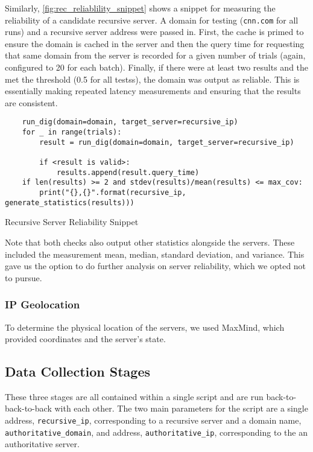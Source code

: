Similarly, \cref{fig:rec_reliablility_snippet} shows a snippet for measuring the reliability of a candidate recursive server. A domain for testing (\texttt{cnn.com} for all runs) and a recursive server \ip address were passed in. First, the cache is primed to ensure the domain is cached in the server and then the query time for requesting that same domain from the server is recorded for a given number of trials (again, configured to 20 for each batch). Finally, if there were at least two results and the \cv met the threshold (0.5 for all testss), the domain was output as reliable. This is essentially making repeated latency measurements and ensuring that the results are consistent.

\begin{code}[H]
\centering
    \begin{verbatim}
    run_dig(domain=domain, target_server=recursive_ip)
    for _ in range(trials):
        result = run_dig(domain=domain, target_server=recursive_ip)

        if <result is valid>:
            results.append(result.query_time)
    if len(results) >= 2 and stdev(results)/mean(results) <= max_cov:
        print("{},{}".format(recursive_ip, generate_statistics(results)))
    \end{verbatim}
    \caption{Recursive Server Reliability Snippet}
    \label{fig:rec_reliablility_snippet}
\end{code}

Note that both checks also output other statistics alongside the servers. These included the measurement mean, median, standard deviation, and variance. This gave us the option to do further analysis on server reliability, which we opted not to pursue.

\subsubsection{IP Geolocation}

To determine the physical location of the \dns servers, we used MaxMind, which provided coordinates and the server's state.

\subsection{Data Collection Stages}

These three stages are all contained within a single script and are run back-to-back-to-back with each other. The two main parameters for the script are a single \ip address, \texttt{recursive\_ip}, corresponding to a recursive server and a domain name, \texttt{authoritative\_domain}, and \ip address, \texttt{authoritative\_ip}, corresponding to the an authoritative server.

